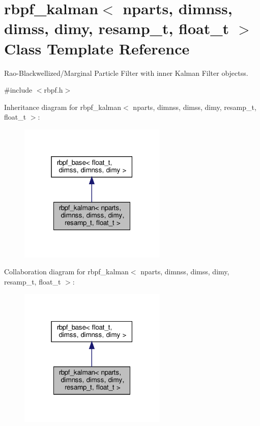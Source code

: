 \hypertarget{classrbpf__kalman}{}\section{rbpf\+\_\+kalman$<$ nparts, dimnss, dimss, dimy, resamp\+\_\+t, float\+\_\+t $>$ Class Template Reference}
\label{classrbpf__kalman}


Rao-\/\+Blackwellized/\+Marginal Particle Filter with inner Kalman Filter objectss.  




{\ttfamily \#include $<$rbpf.\+h$>$}



Inheritance diagram for rbpf\+\_\+kalman$<$ nparts, dimnss, dimss, dimy, resamp\+\_\+t, float\+\_\+t $>$\+:
\nopagebreak
\begin{figure}[H]
\begin{center}
\leavevmode
\includegraphics[width=199pt]{classrbpf__kalman__inherit__graph}
\end{center}
\end{figure}


Collaboration diagram for rbpf\+\_\+kalman$<$ nparts, dimnss, dimss, dimy, resamp\+\_\+t, float\+\_\+t $>$\+:
\nopagebreak
\begin{figure}[H]
\begin{center}
\leavevmode
\includegraphics[width=199pt]{classrbpf__kalman__coll__graph}
\end{center}
\end{figure}
